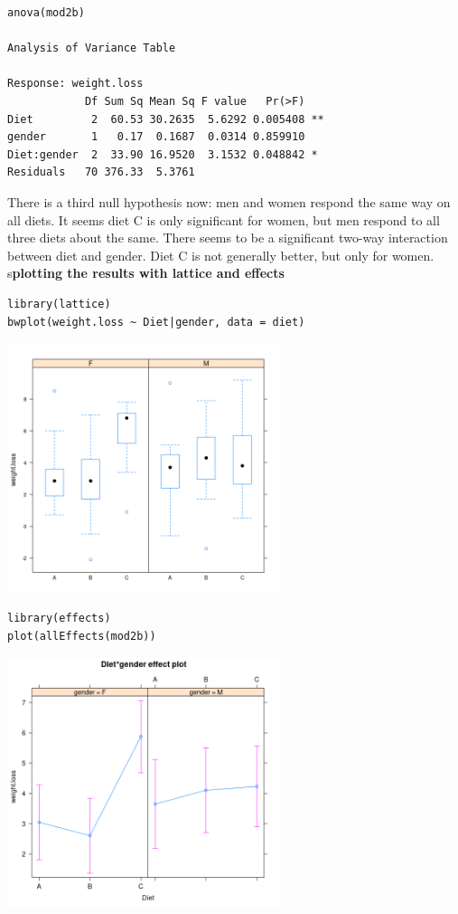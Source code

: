 \documentclass{article}
\begin{document}
\begin{lstlisting}
anova(mod2b)

Analysis of Variance Table

Response: weight.loss
            Df Sum Sq Mean Sq F value   Pr(>F)   
Diet         2  60.53 30.2635  5.6292 0.005408 **
gender       1   0.17  0.1687  0.0314 0.859910   
Diet:gender  2  33.90 16.9520  3.1532 0.048842 * 
Residuals   70 376.33  5.3761                    

\end{lstlisting}
There is a third null hypothesis now: men and women respond the same way on all diets. It seems diet C is only significant for women, but men respond to all three diets about the same. There seems to be a significant two-way interaction between diet and gender. Diet C is not generally better, but only for women.\\
s\textbf{plotting the results with lattice and effects}
\begin{lstlisting}
library(lattice)
bwplot(weight.loss ~ Diet|gender, data = diet)
\end{lstlisting}
\begin{center}
\includegraphics[width = 0.6\textwidth]{lab3/lattice.png}
\end{center}

\begin{lstlisting}
library(effects)
plot(allEffects(mod2b))
\end{lstlisting}
\begin{center}
\includegraphics[width = 0.6\textwidth]{lab3/effects.png}
\end{center}
\end{document}
